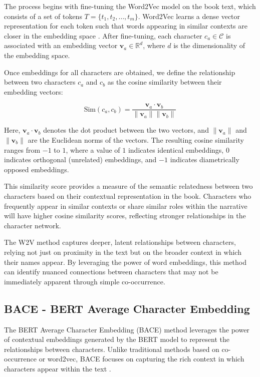 \documentclass[a4paper,12pt]{report}
\begin{document}
The process begins with fine-tuning the Word2Vec model on the book text, which consists of a set of tokens $T = \{t_1, t_2, \dots, t_m\}$. Word2Vec learns a dense vector representation for each token such that words appearing in similar contexts are closer in the embedding space \cite{MIKOLOV2013}. After fine-tuning, each character $c_a \in \mathcal{C}$ is associated with an embedding vector $\mathbf{v}_a \in \mathbb{R}^d$, where $d$ is the dimensionality of the embedding space.

Once embeddings for all characters are obtained, we define the relationship between two characters $c_a$ and $c_b$ as the cosine similarity \cite{MIKOLOV2013Distributed} between their embedding vectors:

\[
\text{Sim}(c_a, c_b) = \frac{\mathbf{v}_a \cdot \mathbf{v}_b}{\|\mathbf{v}_a\| \|\mathbf{v}_b\|}
\]

Here, $\mathbf{v}_a \cdot \mathbf{v}_b$ denotes the dot product between the two vectors, and $\|\mathbf{v}_a\|$ and $\|\mathbf{v}_b\|$ are the Euclidean norms of the vectors. The resulting cosine similarity ranges from $-1$ to $1$, where a value of $1$ indicates identical embeddings, $0$ indicates orthogonal (unrelated) embeddings, and $-1$ indicates diametrically opposed embeddings.

This similarity score provides a measure of the semantic relatedness between two characters based on their contextual representation in the book. Characters who frequently appear in similar contexts or share similar roles within the narrative will have higher cosine similarity scores, reflecting stronger relationships in the character network.

The W2V method captures deeper, latent relationships between characters, relying not just on proximity in the text but on the broader context in which their names appear. By leveraging the power of word embeddings, this method can identify nuanced connections between characters that may not be immediately apparent through simple co-occurrence.

\subsection{BACE - BERT Average Character Embedding}
\label{BACE}

The BERT Average Character Embedding (BACE) method leverages the power of contextual embeddings generated by the BERT model to represent the relationships between characters. Unlike traditional methods based on co-occurrence or word2vec, BACE focuses on capturing the rich context in which characters appear within the text \cite{ROGERS2020}.
\end{document}
